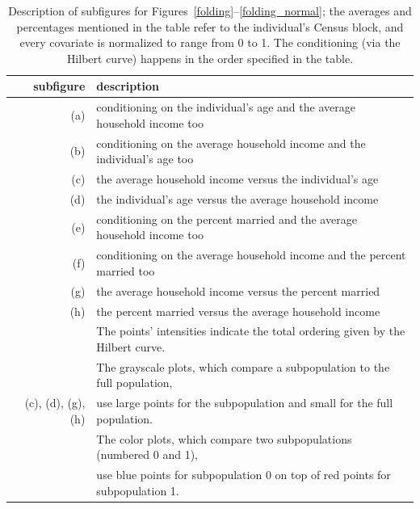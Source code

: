 \documentclass{article}
\begin{document}
\begin{table}
\caption{Description of subfigures
for Figures~\ref{folding}--\ref{folding_normal};
the averages and percentages mentioned in the table refer to the individual's
Census block, and every covariate is normalized to range from 0 to 1.
The conditioning (via the Hilbert curve) happens in the order specified
in the table.}
\label{labels}
\begin{center}
\begin{tabular}{rl}
subfigure & description \\\hline
(a) & conditioning on the individual's age and the average household income
too \\
(b) & conditioning on the average household income and the individual's age
too \\
(c) & the average household income versus the individual's age \\
(d) & the individual's age versus the average household income \\
(e) & conditioning on the percent married and the average household income
too \\
(f) & conditioning on the average household income and the percent married
too \\
(g) & the average household income versus the percent married \\
(h) & the percent married versus the average household income \\\hline
& The points' intensities indicate the total ordering given
by the Hilbert curve. \\
& The grayscale plots, which compare a subpopulation to the full population, \\
(c), (d), (g), (h) &
use large points for the subpopulation and small for the full population. \\
& The color plots, which compare two subpopulations (numbered 0 and 1), \\
& use blue points for subpopulation 0 on top of red points for subpopulation 1.
\end{tabular}
\end{center}
\end{table}
\end{document}
